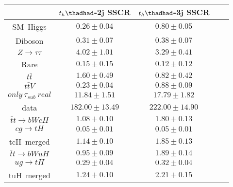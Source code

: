 \begin{tabular}{|c|c|c|c|c|} \hline
& $t_{h}\thadhad$-2j SSCR  & $t_{h}\thadhad$-3j SSCR\\\hline
SM~Higgs                & $0.26\pm0.04$                        & $0.80\pm0.05$\\\hline
Diboson                 & $0.31\pm0.07$                        & $0.38\pm0.07$\\\hline
$Z\to\tau\tau$          & $4.02\pm1.01$                        & $3.29\pm0.41$\\\hline
Rare                    & $0.15\pm0.15$                        & $0.12\pm0.12$\\\hline
$t\bar{t}$              & $1.60\pm0.49$                        & $0.82\pm0.42$\\\hline
$t\bar{t}V$             & $0.23\pm0.04$                        & $0.88\pm0.09$\\\hline
$only~\tau_{sub}~real$  & $11.84\pm1.51$                       & $17.79\pm1.82$\\\hline
data                    & $182.00\pm13.49$                     & $222.00\pm14.90$\\\hline
$\bar{t}t\to bWcH$      & $1.08\pm0.10$                        & $1.80\pm0.13$\\\hline
$cg\to tH$              & $0.05\pm0.01$                        & $0.05\pm0.01$\\\hline
tcH~merged              & $1.14\pm0.10$                        & $1.85\pm0.13$\\\hline
$\bar{t}t\to bWuH$      & $0.95\pm0.09$                        & $1.89\pm0.14$\\\hline
$ug\to tH$              & $0.29\pm0.04$                        & $0.32\pm0.04$\\\hline
tuH~merged              & $1.24\pm0.10$                        & $2.21\pm0.15$\\\hline
\end{tabular}